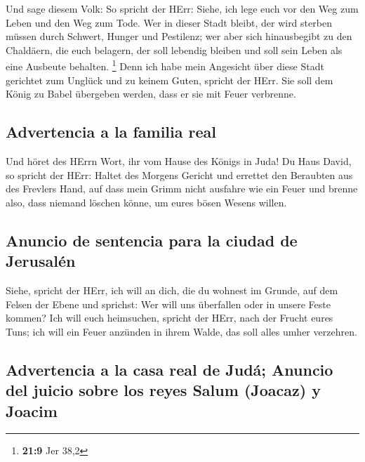  Und sage diesem Volk: So spricht der HErr: Siehe, ich
lege euch vor den Weg zum Leben und den Weg zum Tode.  Wer
in dieser Stadt bleibt, der wird sterben müssen durch Schwert, Hunger
und Pestilenz; wer aber sich hinausbegibt zu den Chaldäern, die euch
belagern, der soll lebendig bleiben und soll sein Leben als eine
Ausbeute behalten. \footnote{\textbf{21:9} Jer 38,2} 
Denn ich habe mein Angesicht über diese Stadt gerichtet zum Unglück und
zu keinem Guten, spricht der HErr. Sie soll dem König zu Babel übergeben
werden, dass er sie mit Feuer verbrenne.

\hypertarget{advertencia-a-la-familia-real}{%
\subsection{Advertencia a la familia
real}\label{advertencia-a-la-familia-real}}

 Und höret des HErrn Wort, ihr vom Hause des Königs in
Juda!  Du Haus David, so spricht der HErr: Haltet des
Morgens Gericht und errettet den Beraubten aus des Frevlers Hand, auf
dass mein Grimm nicht ausfahre wie ein Feuer und brenne also, dass
niemand löschen könne, um eures bösen Wesens willen.

\hypertarget{anuncio-de-sentencia-para-la-ciudad-de-jerusaluxe9n}{%
\subsection{Anuncio de sentencia para la ciudad de
Jerusalén}\label{anuncio-de-sentencia-para-la-ciudad-de-jerusaluxe9n}}

 Siehe, spricht der HErr, ich will an dich, die du
wohnest im Grunde, auf dem Felsen der Ebene und sprichst: Wer will uns
überfallen oder in unsere Feste kommen?  Ich will euch
heimsuchen, spricht der HErr, nach der Frucht eures Tuns; ich will ein
Feuer anzünden in ihrem Walde, das soll alles umher verzehren.

\hypertarget{advertencia-a-la-casa-real-de-juduxe1-anuncio-del-juicio-sobre-los-reyes-salum-joacaz-y-joacim}{%
\subsection{Advertencia a la casa real de Judá; Anuncio del juicio sobre
los reyes Salum (Joacaz) y
Joacim}\label{advertencia-a-la-casa-real-de-juduxe1-anuncio-del-juicio-sobre-los-reyes-salum-joacaz-y-joacim}}

